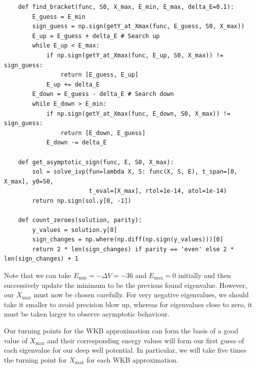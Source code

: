 \documentclass{article}
\begin{document}
\begin{verbatim}
    def find_bracket(func, S0, X_max, E_min, E_max, delta_E=0.1):
        E_guess = E_min
        sign_guess = np.sign(getY_at_Xmax(func, E_guess, S0, X_max))
        E_up = E_guess + delta_E # Search up
        while E_up < E_max:
            if np.sign(getY_at_Xmax(func, E_up, S0, X_max)) != sign_guess:
                return [E_guess, E_up]
            E_up += delta_E
        E_down = E_guess - delta_E # Search down
        while E_down > E_min:
            if np.sign(getY_at_Xmax(func, E_down, S0, X_max)) != sign_guess:
                return [E_down, E_guess]
            E_down -= delta_E

    def get_asymptotic_sign(func, E, S0, X_max):
        sol = solve_ivp(fun=lambda X, S: func(X, S, E), t_span=[0, X_max], y0=S0,
                        t_eval=[X_max], rtol=1e-14, atol=1e-14)
        return np.sign(sol.y[0, -1])

    def count_zeroes(solution, parity):
        y_values = solution.y[0]
        sign_changes = np.where(np.diff(np.sign(y_values)))[0]
        return 2 * len(sign_changes) if parity == 'even' else 2 * len(sign_changes) + 1
\end{verbatim}

Note that we can take \(E_{\min} = -\Delta V = -36\) and \(E_{\max} = 0\) initially and then successively update the minimum to be the previous found eigenvalue. However, our \(X_{\max}\) must now be chosen carefully. For very negative eigenvalues, we should take it smaller to avoid precision blow up, whereas for eigenvalues close to zero, it must be taken larger to observe asymptotic behaviour. 

Our turning points for the WKB approximation can form the basis of a good value of \(X_{\max}\) and their corresponding energy values will form our first guess of each eigenvalue for our deep well potential. In particular, we will take five times the turning point for \(X_{\max}\) for each WKB approximation.
\end{document}
